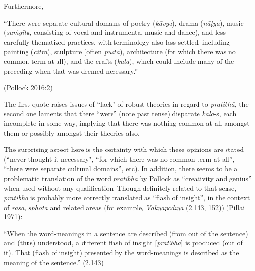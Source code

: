 
Furthermore, 

\begin{myquote}
“There were separate cultural domains of poetry (\textsl{kāvya}), drama (\textsl{nāṭya}), music (\textsl{saṁgīta}, consisting of vocal and instrumental music and dance), and less carefully thematized practices, with terminology also less settled, including painting (\textsl{citra}), sculpture (often \textsl{pusta}), architecture (for which there was no common term at all), and the crafts (\textsl{kalā}), which could include many of the preceding when that was deemed necessary.” 

\hfill(Pollock 2016:2)
\end{myquote}

\newpage

The first quote raises issues of “lack” of robust theories in regard to \textsl{pratibhā}, the second one laments that there “were” (note past tense) disparate \textsl{kalā}-s, each incomplete in some way, implying that there was nothing common at all amongst them or possibly amongst their theories also.

The surprising aspect here is the certainty with which these opinions are stated (``never thought it necessary", “for which there was no common term at all”, “there were separate cultural domains”, etc). In addition, there seems to be a problematic translation of the word \textsl{pratibhā} by Pollock as “creativity and genius” when used without any qualification. Though definitely related to that sense, \textsl{pratibhā} is probably more correctly translated as “flash of insight”, in the context of \textsl{rasa}, \textsl{sphoṭa} and related areas (for example, \textsl{Vākyapadīya} (2.143, 152)) (Pillai 1971):

“When the word-meanings in a sentence are described (from out of the sentence) and (thus) understood, a different flash of insight [\textsl{pratibhā}] is produced (out of it). That (flash of insight) presented by the word-meanings is described as the meaning of the sentence.” (2.143)

